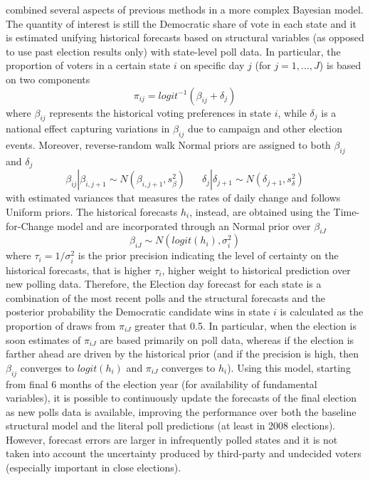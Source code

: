 \documentclass[
  12pt]{article}
\begin{document}
\citep{lin:2013} combined several aspects of previous methods in a more
complex Bayesian model. The quantity of interest is still the Democratic
share of vote in each state and it is estimated unifying historical
forecasts based on structural variables (as opposed to use past election
results only) with state-level poll data. In particular, the proportion
of voters in a certain state \(i\) on specific day \(j\) (for
\(j = 1,...,J\)) is based on two components
\[\pi_{ij} = logit^{-1}(\beta_{ij} + \delta_j)\] where \(\beta_{ij}\)
represents the historical voting preferences in state \(i\), while
\(\delta_j\) is a national effect capturing variations in \(\beta_{ij}\)
due to campaign and other election events. Moreover, reverse-random walk
Normal priors are assigned to both \(\beta_{ij}\) and \(\delta_j\)
\[\beta_{ij} | \beta_{i,j+1} \sim N(\beta_{i,j+1}, s^2_{\beta}) \;\;\;\;\;\; \delta_{j} | \delta_{j+1} \sim N(\delta_{j+1}, s^2_{\delta})\]
with estimated variances that measures the rates of daily change and
follows Uniform priors. The historical forecasts \(h_i\), instead, are
obtained using the \citet{abr:2008} Time-for-Change model and are
incorporated through an Normal prior over \(\beta_{iJ}\)
\[\beta_{iJ} \sim N(logit(h_i), \sigma_i^2)\] where
\(\tau_i = 1 / \sigma_i^2\) is the prior precision indicating the level
of certainty on the historical forecasts, that is higher \(\tau_i\),
higher weight to historical prediction over new polling data. Therefore,
the Election day forecast for each state is a combination of the most
recent polls and the structural forecasts and the posterior probability
the Democratic candidate wins in state \(i\) is calculated as the
proportion of draws from \(\pi_{iJ}\) greater that 0.5. In particular,
when the election is soon estimates of \(\pi_{iJ}\) are based primarily
on poll data, whereas if the election is farther ahead are driven by the
historical prior (and if the precision is high, then \(\beta_{ij}\)
converges to \(logit(h_i)\) and \(\pi_{iJ}\) converges to \(h_i\)).
Using this model, starting from final 6 months of the election year (for
availability of fundamental variables), it is possible to continuously
update the forecasts of the final election as new polls data is
available, improving the performance over both the baseline structural
model and the literal poll predictions (at least in 2008 elections).
However, forecast errors are larger in infrequently polled states and it
is not taken into account the uncertainty produced by third-party and
undecided voters (especially important in close elections).
\end{document}
